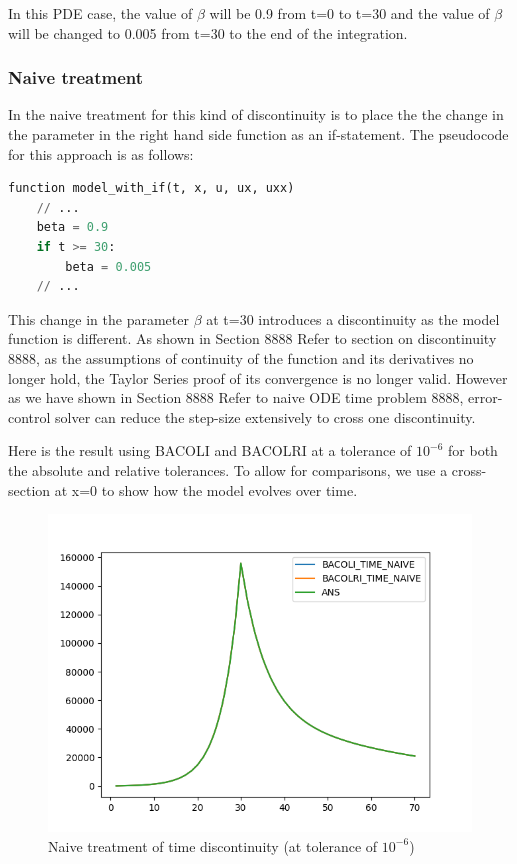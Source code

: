 \documentclass{article}
\begin{document}
In this PDE case, the value of $\beta$ will be 0.9 from t=0 to t=30 and the value of $\beta$ will be changed to 0.005 from t=30 to the end of the integration.

\subsubsection{Naive treatment}
In the naive treatment for this kind of discontinuity is to place the the change in the parameter in the right hand side function as an if-statement. The pseudocode for this approach is as follows:

\begin{minipage}{\linewidth}
\begin{lstlisting}[language=Python]
function model_with_if(t, x, u, ux, uxx)
    // ...
    beta = 0.9
    if t >= 30:
        beta = 0.005
    // ...

\end{lstlisting}
\end{minipage}

This change in the parameter $\beta$ at t=30 introduces a discontinuity as the model function is different. As shown in Section 8888 Refer to section on discontinuity 8888, as the assumptions of continuity of the function and its derivatives no longer hold, the Taylor Series proof of its convergence is no longer valid. However as we have shown in Section 8888 Refer to naive ODE time problem 8888, error-control solver can reduce the step-size extensively to cross one discontinuity.

Here is the result using BACOLI and BACOLRI at a tolerance of $10^{-6}$ for both the absolute and relative tolerances. To allow for comparisons, we use a cross-section at x=0 to show how the model evolves over time.

\begin{figure}[H]
\centering
\includegraphics[width=0.7\linewidth]{./figures/pde_time_disc_naive}
\caption{Naive treatment of time discontinuity (at tolerance of $10^{-6}$)}
\label{fig:pde_time_disc_naive}
\end{figure}
\end{document}

